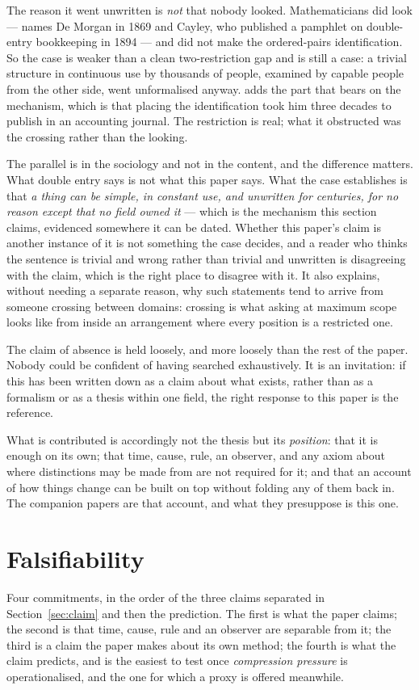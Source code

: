 \documentclass[11pt,a4paper]{article}
\begin{document}
The reason it went unwritten is \emph{not} that nobody looked. Mathematicians did look --- \citeauthor{ellerman2014} names De Morgan in 1869 and Cayley,
who published a pamphlet on double-entry bookkeeping in 1894 --- and did not make the ordered-pairs
identification. So the case is weaker than a clean two-restriction gap and is still a case: a trivial
structure in continuous use by thousands of people, examined by capable people from the other side, went
unformalised anyway. \citeauthor{ellerman2014} adds the part that bears on the mechanism, which is that
placing the identification took him three decades to publish in an accounting journal. The restriction
is real; what it obstructed was the crossing rather than the looking.

The parallel is in the sociology and not in the content, and the difference matters. What double entry
says is not what this paper says. What the case establishes is that \emph{a thing can be simple, in
constant use, and unwritten for centuries, for no reason except that no field owned it} --- which is the
mechanism this section claims, evidenced somewhere it can be dated. Whether this paper's claim is
another instance of it is not something the case decides, and a reader who thinks the sentence is
trivial and wrong rather than trivial and unwritten is disagreeing with the claim, which is the right
place to disagree with it. It also
explains, without needing a separate reason, why such statements tend to arrive from someone crossing
between domains: crossing is what asking at maximum scope looks like from inside an arrangement where
every position is a restricted one.

The claim of absence is held loosely, and more loosely than the rest of the paper. Nobody could be
confident of having searched exhaustively. It is an invitation: if this has been written down as a claim about what
exists, rather than as a formalism or as a thesis within one field, the right response to this paper is
the reference.

What is contributed is accordingly not the thesis but its \emph{position}: that it is enough on its own;
that time, cause, rule, an observer, and any axiom about where distinctions may be made from are not
required for it; and that an account of how things change can be built on top without folding any of
them back in. The companion papers are that account, and what they presuppose is this one.

\section{Falsifiability}\label{sec:falsifiability}
Four commitments, in the order of the three claims separated in Section~\ref{sec:claim} and then the
prediction. The first is what the paper claims; the second is that time, cause, rule and an observer
are separable from it; the third is a claim the paper makes about its own method; the fourth is what
the claim predicts, and is the easiest to test once \emph{compression pressure} is operationalised, and
the one for which a proxy is offered meanwhile.
\end{document}
